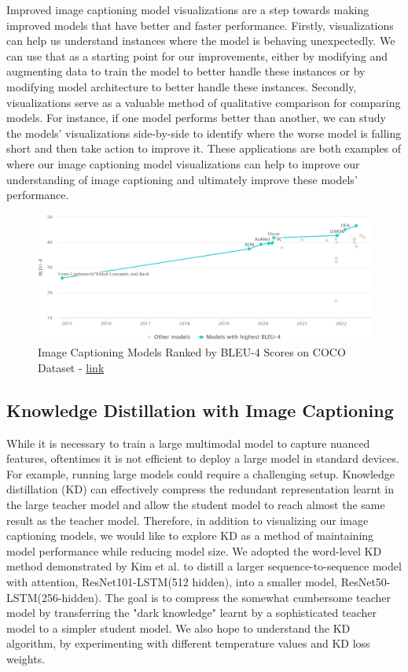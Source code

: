\documentclass[10pt,twocolumn,letterpaper]{article}
\begin{document}
Improved image captioning model visualizations are a step towards making improved models that have better and faster performance. Firstly, visualizations can help us understand instances where the model is behaving unexpectedly. We can use that as a starting point for our improvements, either by modifying and augmenting data to train the model to better handle these instances or by modifying model architecture to better handle these instances. Secondly, visualizations serve as a valuable method of qualitative comparison for comparing models. For instance, if one model performs better than another, we can study the models’ visualizations side-by-side to identify where the worse model is falling short and then take action to improve it. These applications are both examples of where our image captioning model visualizations can help to improve our understanding of image captioning and ultimately improve these models’ performance.

\begin{figure}[t]
\begin{center}
   \includegraphics[width=1.0\linewidth]{images/COCO_Image_Captioning_Scores.png}
\end{center}
   \caption{Image Captioning Models Ranked by BLEU-4 Scores on COCO Dataset - \href{https://paperswithcode.com/sota/image-captioning-on-coco-captions}{link}}
\label{fig:COCOBest}
\end{figure}

\subsection{Knowledge Distillation with Image Captioning}
While it is necessary to train a large multimodal model to capture nuanced features, oftentimes it is not efficient to deploy a large model in standard devices. For example, running large models could require a challenging setup. Knowledge distillation (KD) can effectively compress the redundant representation learnt in the large teacher model and allow the student model to reach almost the same result as the teacher model. Therefore, in addition to visualizing our image captioning models, we would like to explore KD as a method of maintaining model performance while reducing model size. We adopted the word-level KD method demonstrated by Kim et al. \cite{kim2016sequencelevel} to distill a larger sequence-to-sequence model with attention, ResNet101-LSTM(512 hidden), into a smaller model, ResNet50-LSTM(256-hidden). The goal is to compress the somewhat cumbersome teacher model by transferring the "dark knowledge" learnt by a sophisticated teacher model to a simpler student model. We also hope to understand the KD algorithm, by experimenting with different temperature values and KD loss weights.
\end{document}
